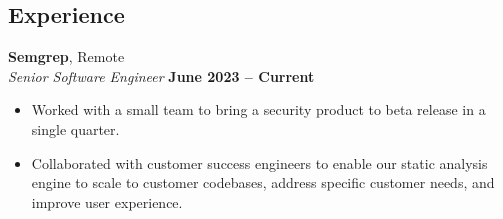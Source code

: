 \documentclass[resmargin,line]{res}
\begin{document}
\begin{resume}

\section{\sc Experience}

{\bf Semgrep}, Remote \\
{\em Senior Software Engineer} \hfill {\bf June 2023 -- Current}\\
%
\begin{itemize}
  \vspace*{-.3cm}
\item Worked with a small team to bring a security product to beta release in a single quarter.
\item Collaborated with customer success engineers to enable our static analysis engine to scale to customer
  codebases, address specific customer needs, and improve user experience.
\end{itemize}



\end{resume}
\end{document}
